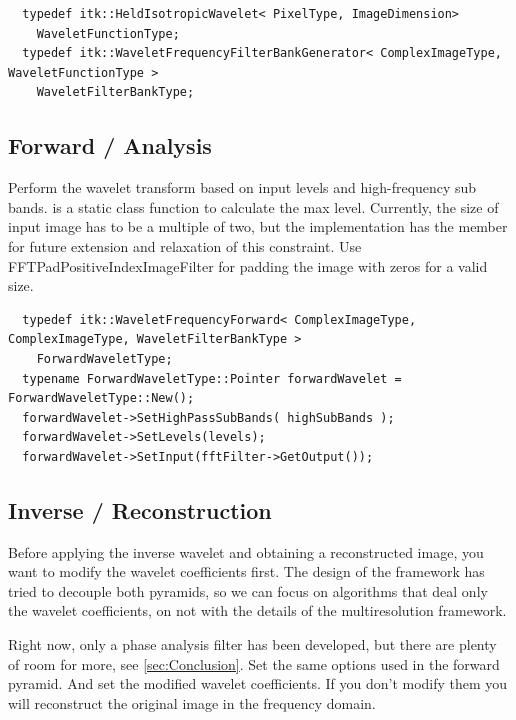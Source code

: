 \begin{verbatim}
  typedef itk::HeldIsotropicWavelet< PixelType, ImageDimension>
    WaveletFunctionType;
  typedef itk::WaveletFrequencyFilterBankGenerator< ComplexImageType, WaveletFunctionType >
    WaveletFilterBankType;
\end{verbatim}

\subsection{Forward / Analysis}
\label{sub:Forward}
Perform the wavelet transform based on input levels and high-frequency sub bands.
 is a static class function to calculate the max level.
Currently, the size of input image has to be a multiple of two, but the implementation has the member  for future extension and relaxation of this constraint. Use FFTPadPositiveIndexImageFilter for padding the image with zeros for a valid size.

\begin{verbatim}
  typedef itk::WaveletFrequencyForward< ComplexImageType, ComplexImageType, WaveletFilterBankType >
    ForwardWaveletType;
  typename ForwardWaveletType::Pointer forwardWavelet = ForwardWaveletType::New();
  forwardWavelet->SetHighPassSubBands( highSubBands );
  forwardWavelet->SetLevels(levels);
  forwardWavelet->SetInput(fftFilter->GetOutput());
\end{verbatim}

\subsection{Inverse / Reconstruction}
\label{sub:Inverse}
Before applying the inverse wavelet and obtaining a reconstructed image, you want to modify the wavelet coefficients first. The design of the framework has tried to decouple both pyramids, so we can focus on algorithms that deal only the wavelet coefficients, on not with the details of the multiresolution framework.\par
Right now, only a phase analysis filter has been developed, but there are plenty of room for more, see \autoref{sec:Conclusion}.
Set the same options used in the forward pyramid. And set the modified wavelet coefficients. If you don't modify them you will reconstruct the original image in the frequency domain.

